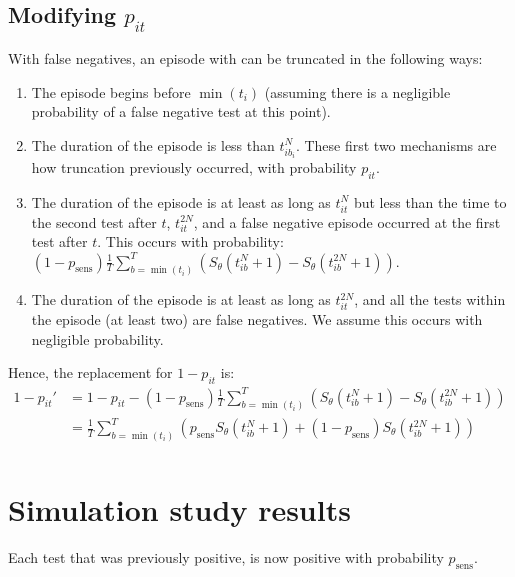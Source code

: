 \documentclass[thesis.tex]{subfiles}
\begin{document}
\subsection{Modifying \texorpdfstring{$p_{it}$}{pit}} \label{modifying-p_it}

With false negatives, an episode with can be truncated in the following
ways:

\begin{enumerate}
\item
  The episode begins before $\min(t_i)$ (assuming there is a
  negligible probability of a false negative test at this point).
\item
  The duration of the episode is less than $t_{ib_i}^N$. These first
  two mechanisms are how truncation previously occurred, with
  probability $p_{it}$.
\item
  The duration of the episode is at least as long as $t_{it}^N$ but
  less than the time to the second test after $t$, $t_{it}^{2N}$,
  and a false negative episode occurred at the first test after $t$.
  This occurs with probability:
  \begin{math}
    (1 - p_\text{sens})\frac{1}{T} \sum_{b=\min(t_i)}^T \left( S_\theta(t_{ib}^N + 1) - S_\theta(t_{ib}^{2N} + 1)\right).
  \end{math}
\item
  The duration of the episode is at least as long as $t_{it}^{2N}$,
  and all the tests within the episode (at least two) are false
  negatives. We assume this occurs with negligible probability.
\end{enumerate}

Hence, the replacement for $1 - p_{it}$ is:
\begin{align}
1 - p_{it}'
&= 1 - p_{it} - (1 - p_\text{sens})\frac{1}{T} \sum_{b=\min(t_i)}^T \left( S_\theta(t_{ib}^N + 1) - S_\theta(t_{ib}^{2N} + 1)\right) \\
&= \frac{1}{T} \sum_{b=\min(t_i)}^T \left( p_\text{sens} S_\theta(t_{ib}^N + 1) + (1 - p_\text{sens}) S_\theta(t_{ib}^{2N} + 1)\right) \\
\end{align}

\section{Simulation study results} \label{imperf-test:sec:sim-study-results}

Each test that was previously positive, is now positive with probability $p_\text{sens}$.
\end{document}
